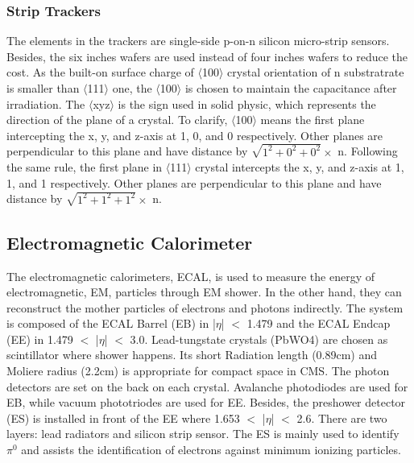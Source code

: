 \subsubsection{Strip Trackers}
The elements in the trackers are single-side p-on-n silicon micro-strip sensors. 
Besides, the six inches wafers are used instead of four inches wafers to reduce the cost. 
As the built-on surface charge of $\langle$100$\rangle$ crystal orientation of n substratrate is smaller than $\langle$111$\rangle$ one, 
the $\langle$100$\rangle$ is chosen to maintain the capacitance after irradiation. The $\langle$xyz$\rangle$ is the sign used in solid physic, which represents the direction of the plane of a crystal. To clarify, $\langle$100$\rangle$ means the first plane intercepting the x, y, and z-axis at 1, 0, and 0 respectively. Other planes are perpendicular to this plane and have distance by $\sqrt{1^2+0^2+0^2} \times$ n. Following the same rule, the first plane in $\langle$111$\rangle$ crystal intercepts the x, y, and z-axis at 1, 1, and 1 respectively. Other planes are perpendicular to this plane and have distance by $\sqrt{1^2+1^2+1^2} \times$ n.

\subsection{Electromagnetic Calorimeter} 
The electromagnetic calorimeters, ECAL, is used to measure the energy of electromagnetic, EM, particles through EM shower. 
In the other hand, they can reconstruct the mother particles of electrons and photons indirectly.
The system is composed of the ECAL Barrel (EB) in |$\eta $| $<$ 1.479 and the ECAL Endcap (EE) in 1.479 $<$ |$\eta $| $<$ 3.0. 
Lead-tungstate crystals (PbWO4) are chosen as scintillator where shower happens.
Its short Radiation length (0.89cm) and Moliere radius (2.2cm) is appropriate for compact space in CMS.
The photon detectors are set on the back on each crystal. 
Avalanche photodiodes are used for EB, while vacuum phototriodes are used for EE. 
Besides, the preshower detector (ES) is installed in front of the EE where 1.653 $<$ |$\eta $| $<$ 2.6. 
There are two layers: lead radiators and silicon strip sensor.
The ES is mainly used to identify $\pi ^0$ and assists the identification of electrons against minimum ionizing particles.
 

